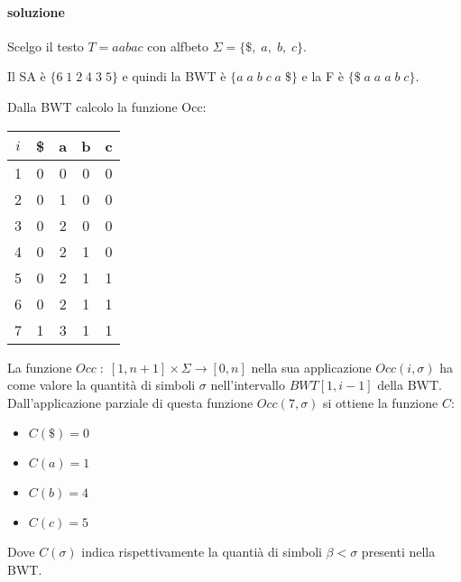 \paragraph{soluzione} Scelgo il testo $T = aabac$ con alfbeto $\Sigma = \{\$, \; a, \; b, \; c\}$.

Il SA \`e $\{6 \; 1 \; 2 \; 4 \; 3 \; 5\}$ e quindi la BWT \`e $\{a \; a \; b \; c \; a \; \$\}$ e la F \`e $\{\$ \; a \; a \; a \; b \; c\}$.

Dalla BWT calcolo la funzione Occ:

\begin{center}
  \begin{tabular}{|c c c c c|}
    $i$ & \$ & a & b & c \\ \hline
    1 & 0 & 0 & 0 & 0 \\ \hline
    2 & 0 & 1 & 0 & 0 \\ \hline
    3 & 0 & 2 & 0 & 0 \\ \hline
    4 & 0 & 2 & 1 & 0 \\ \hline
    5 & 0 & 2 & 1 & 1 \\ \hline
    6 & 0 & 2 & 1 & 1 \\ \hline
    7 & 1 & 3 & 1 & 1 \\ \hline
  \end{tabular}
\end{center}

La funzione $Occ \; : \; [1,n+1] \times \Sigma \rightarrow [0,n]$ nella sua applicazione $Occ(i, \sigma)$ ha come valore la quantit\`a di simboli $\sigma$ nell'intervallo $BWT[1,i-1]$ della BWT.
Dall'applicazione parziale di questa funzione $Occ(7, \sigma)$ si ottiene la funzione $C$:

\begin{itemize}
  \item $C(\$) = 0$
  \item $C(a) = 1$
  \item $C(b) = 4$
  \item $C(c) = 5$
\end{itemize}

Dove $C(\sigma)$ indica rispettivamente la quanti\`a di simboli $\beta < \sigma$ presenti nella BWT.
